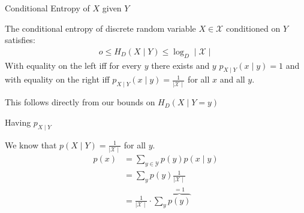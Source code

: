 \begin{parag}{Conditional Entropy of $X$ given $Y$}
    \begin{theoreme}
        The conditional entropy of discrete random variable $X \in \mathcal{X}$ conditioned on $Y$ satisfies:
        \begin{align*}
            o \leq H_D(X \mid  Y) \leq \log_D \mid \mathcal{X} \mid
        \end{align*}
        With equality on the left iff for every $y$ there exists and $y$  $p_{X \mid  Y}( x \mid  y) = 1$ and with equality on the right iff $p_{X \mid  Y}(x \mid  y) = \frac{1}{ \mid \mathcal{X} \mid}$ for all $x$ and all $y$.
    \end{theoreme}
    This follows directly from our bounds on $H_D(X \mid Y = y)$
    \begin{framedremark}
        Having $p_{X \mid  Y}$
    \end{framedremark}
    We know that $p(X \mid Y) = \frac{1}{ \mid \mathcal{X} \mid}$  for all $y$.
    \\
    \begin{align*}
        p(x) &= \sum_{y \in \mathcal{Y}}p(y) p(x \mid  y) \\
        &= \sum_y p(y) \frac{1}{ \mid \mathcal{X} \mid} \\
        &= \frac{1}{ \mid \mathcal{X} \mid} \cdot \sum_y \overbrace{p(y)}^{=1}
    \end{align*}
    
    
    

\end{parag}





